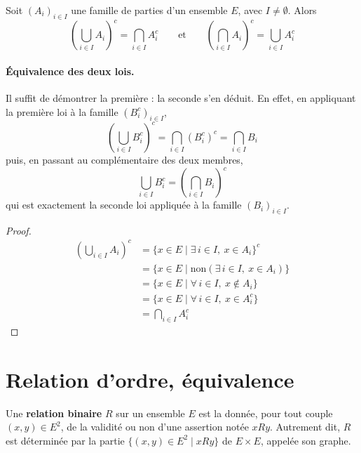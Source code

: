 \begin{prop}
\label{prop:de-morgan}
Soit $(A_i)_{i\in I}$ une famille de parties d'un ensemble $E$, avec $I\neq\emptyset$. Alors
\[\left(\bigcup_{i\in I} A_i\right)^{c} = \bigcap_{i\in I} A_i^{c}
\qquad\text{et}\qquad
\left(\bigcap_{i\in I} A_i\right)^{c} = \bigcup_{i\in I} A_i^{c}\]
\end{prop}

\paragraph{Équivalence des deux lois.}
Il suffit de démontrer la première : la seconde s'en déduit. En effet, en appliquant la première loi à la famille $(B_i^{c})_{i\in I}$,
\[\left(\bigcup_{i\in I} B_i^{c}\right)^{c} = \bigcap_{i\in I} \left(B_i^{c}\right)^{c} = \bigcap_{i\in I} B_i\]
puis, en passant au complémentaire des deux membres,
\[\bigcup_{i\in I} B_i^{c} = \left(\bigcap_{i\in I} B_i\right)^{c}\]
qui est exactement la seconde loi appliquée à la famille $(B_i)_{i\in I}$.

\begin{proof}
\begin{align*}
\left(\bigcup_{i\in I} A_i\right)^{c}
&= \{x \in E \mid \exists\, i \in I,\ x \in A_i\}^{c} \\
&= \{x \in E \mid \text{non}(\exists\, i \in I,\ x \in A_i)\} \\
&= \{x \in E \mid \forall\, i \in I,\ x \notin A_i\} \\
&= \{x \in E \mid \forall\, i \in I,\ x \in A_i^{c}\} \\
&= \bigcap_{i\in I} A_i^{c}
\end{align*}
\end{proof}

\section{Relation d'ordre, équivalence}

\begin{defi}
Une \textbf{relation binaire} $R$ sur un ensemble $E$ est la donnée, pour tout couple $(x,y)\in E^2$, de la validité ou non d'une assertion notée $xRy$. Autrement dit, $R$ est déterminée par la partie $\{(x,y)\in E^2 \mid xRy\}$ de $E\times E$, appelée son graphe.
\end{defi}

